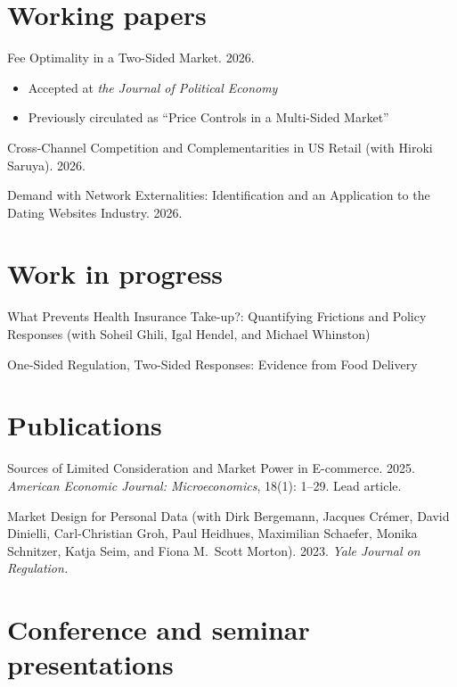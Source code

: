 \documentclass[11pt]{article} %
\begin{document}
\section*{Working papers}

Fee Optimality in a Two-Sided Market. 2026.
\begin{itemize}
	\item Accepted at \textit{the Journal of Political Economy}
	\item Previously circulated as ``Price Controls in a Multi-Sided Market''
\end{itemize}

\medskip

Cross-Channel Competition and Complementarities in US Retail
(with Hiroki Saruya). 2026.

\medskip

 
Demand with Network Externalities: 
Identification and an Application to the Dating Websites Industry. 2026.

\section*{Work in progress}

 What Prevents Health Insurance Take-up?: Quantifying Frictions and Policy Responses
(with Soheil Ghili, Igal Hendel, and Michael Whinston)

\medskip

One-Sided Regulation, Two-Sided Responses: Evidence from Food Delivery


\section*{Publications}

Sources of Limited Consideration and Market Power in E-commerce. 2025.
\textit{American Economic Journal: Microeconomics}, 18(1): 1--29. Lead article.

\medskip


Market Design for Personal Data
(with Dirk Bergemann, Jacques Cr\'{e}mer, David Dinielli, 
Carl-Christian Groh, Paul Heidhues, Maximilian Schaefer, 
Monika Schnitzer, Katja Seim, and Fiona M.\ Scott Morton).
2023. \textit{Yale Journal on Regulation.}




\section*{Conference and seminar presentations}
\end{document}
